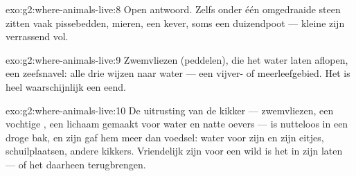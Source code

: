 \begin{solution}{exo:g2:where-animals-live:8}
Open antwoord. Zelfs onder één omgedraaide steen zitten vaak
pissebedden, mieren, een kever, soms een duizendpoot --- kleine
 zijn verrassend vol.
\end{solution}

\begin{solution}{exo:g2:where-animals-live:9}
Zwemvliezen (peddelen),  die het water laten aflopen, een zeefsnavel:
alle drie wijzen naar water --- een vijver- of meerleefgebied. Het 
is heel waarschijnlijk een eend.
\end{solution}

\begin{solution}{exo:g2:where-animals-live:10}
De uitrusting van de kikker --- zwemvliezen, een vochtige , een
lichaam gemaakt voor water en natte oevers --- is nutteloos in een
droge bak, en zijn  gaf hem meer dan voedsel: water voor zijn
 en zijn eitjes, schuilplaatsen, andere kikkers. Vriendelijk zijn
voor een wild  is het in zijn  laten --- of het daarheen
terugbrengen.
\end{solution}
